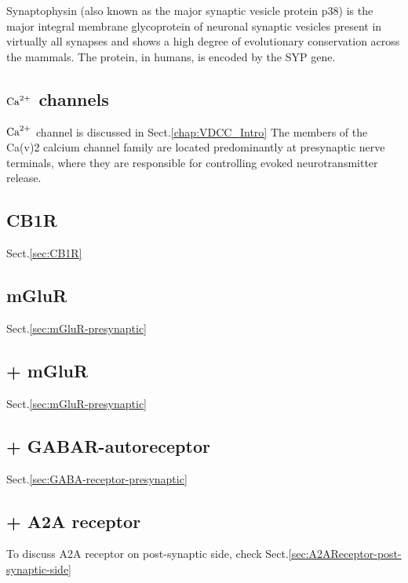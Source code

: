 Synaptophysin (also known as the major synaptic vesicle protein p38) is the
major integral membrane glycoprotein of neuronal synaptic vesicles present in
virtually all synapses and shows a high degree of evolutionary conservation
across the mammals. The protein, in humans, is encoded by the SYP gene.

\subsection{${\text{Ca}^{2+}}$ channels}

${\text{Ca}^{2+}}$ channel is discussed in Sect.\ref{chap:VDCC_Intro} The members of the
Ca(v)2 calcium channel family are located predominantly at presynaptic nerve
terminals, where they are responsible for controlling evoked neurotransmitter
release.

\subsection{CB1R}

Sect.\ref{sec:CB1R}

\subsection{mGluR}

Sect.\ref{sec:mGluR-presynaptic}

\subsection{+ mGluR}

Sect.\ref{sec:mGluR-presynaptic}

\subsection{+ GABAR-autoreceptor}

Sect.\ref{sec:GABA-receptor-presynaptic}

\subsection{+ A2A receptor}
\label{sec:A2AReceptor-pre-synapse}

To discuss A2A receptor on post-synaptic side, check Sect.\ref{sec:A2AReceptor-post-synaptic-side}

